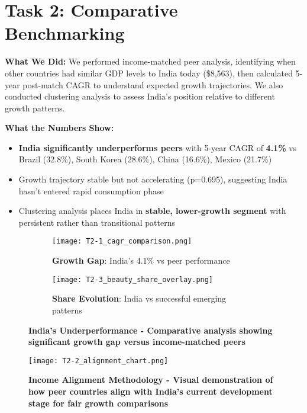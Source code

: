 \documentclass[11pt]{article}
\begin{document}
\section{Task 2: Comparative Benchmarking}

\textbf{What We Did:} We performed income-matched peer analysis, identifying when other countries had similar GDP levels to India today (\$8,563), then calculated 5-year post-match CAGR to understand expected growth trajectories. We also conducted clustering analysis to assess India's position relative to different growth patterns.

\textbf{What the Numbers Show:}
\vspace{-5pt}
\begin{itemize}
    \setlength{\itemsep}{-2pt}
    \item \textbf{India significantly underperforms peers} with 5-year CAGR of \textbf{4.1\%} vs Brazil (32.8\%), South Korea (28.6\%), China (16.6\%), Mexico (21.7\%)
    \item Growth trajectory stable but not accelerating (p=0.695), suggesting India hasn't entered rapid consumption phase
    \item Clustering analysis places India in \textbf{stable, lower-growth segment} with persistent rather than transitional patterns
\end{itemize}

\begin{figure}[H]
\centering
\begin{subfigure}[b]{0.48\textwidth}
    \texttt{[image: T2-1\_cagr\_comparison.png]}
    \caption{\textbf{Growth Gap}: India's 4.1\% vs peer performance}
\end{subfigure}
\hfill
\begin{subfigure}[b]{0.48\textwidth}
    \texttt{[image: T2-3\_beauty\_share\_overlay.png]}
    \caption{\textbf{Share Evolution}: India vs successful emerging patterns}
\end{subfigure}
\caption{\textbf{India's Underperformance - Comparative analysis showing significant growth gap versus income-matched peers}}
\end{figure}

\begin{figure}[H]
\centering
\texttt{[image: T2-2\_alignment\_chart.png]}
\caption{\textbf{Income Alignment Methodology - Visual demonstration of how peer countries align with India's current development stage for fair growth comparisons}}
\end{figure}
\end{document}
